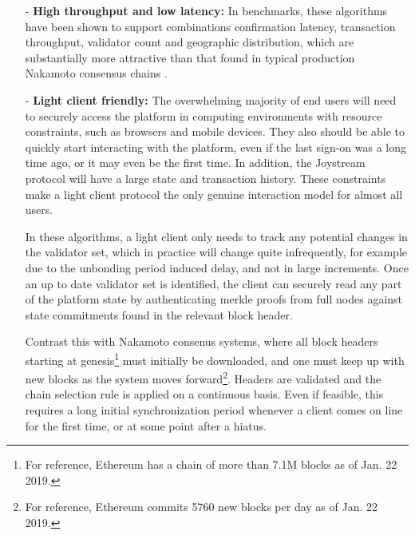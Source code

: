 \documentclass{article}
\begin{document}
\begin{itemize}

    \item[-] \textbf{High throughput and low latency:} In benchmarks, these algorithms have been shown to support combinations confirmation latency, transaction throughput, validator count and geographic distribution, which are substantially more attractive than that found in typical production Nakamoto consensus chains \cite{cosmos}.


    \item[-] \textbf{Light client friendly:} The overwhelming majority of end users will need to securely access the platform in computing environments with resource constraints, such as browsers and mobile devices. They also should be able to quickly start interacting with the platform, even if the last sign-on was a long time ago, or it may even be the first time. In addition, the Joystream protocol will have a large state and transaction history. These constraints make a light client protocol the only genuine interaction model for almost all users.

    In these algorithms, a light client only needs to track any potential changes in the validator set, which in practice will change quite infrequently, for example due to the unbonding period induced delay, and not in large increments. Once an up to date validator set is identified, the client can securely read any part of the platform state by authenticating merkle proofs from full nodes against state commitments found in the relevant block header.

    Contrast this with Nakamoto consenus systems, where all block headers starting at genesis\footnote{For reference, Ethereum has a chain of more than 7.1M blocks as of Jan. 22 2019.} must initially be downloaded, and one must keep up with new blocks as the system moves forward\footnote{For reference, Ethereum commits 5760 new blocks per day as of Jan. 22 2019.}. Headers are validated and the chain selection rule is applied on a continuous basis. Even if feasible, this requires a long initial synchronization period whenever a client comes on line for the first time, or at some point after a hiatus.



\end{itemize}
\end{document}
